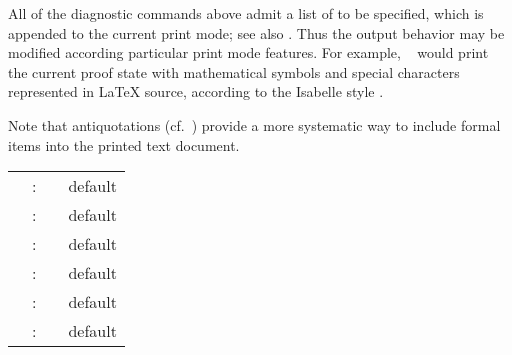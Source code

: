 \begin{isabellebody}
\begin{isamarkuptext}
\begin{description}
  \end{description}

  All of the diagnostic commands above admit a list of 
  to be specified, which is appended to the current print mode; see
  also .  Thus the output behavior may be
  modified according particular print mode features.  For example,
  \hyperlink{command.pr}{\mbox{}}~ would print the current
  proof state with mathematical symbols and special characters
  represented in {\LaTeX} source, according to the Isabelle style
  \cite{isabelle-sys}.

  Note that antiquotations (cf.\ ) provide a more
  systematic way to include formal items into the printed text
  document.%
\end{isamarkuptext}%
\isamarkuptrue%
%
\isamarkuptrue%
%
\begin{isamarkuptext}%
\begin{tabular}{rcll}
    \indexdef{}{attribute}{show\_types}\hypertarget{attribute.show-types}{\hyperlink{attribute.show-types}{\mbox{\isa{show{\isaliteral{5F}{\isacharunderscore}}types}}}} & : & \isa{attribute} & default \isa{false} \\
    \indexdef{}{attribute}{show\_sorts}\hypertarget{attribute.show-sorts}{\hyperlink{attribute.show-sorts}{\mbox{\isa{show{\isaliteral{5F}{\isacharunderscore}}sorts}}}} & : & \isa{attribute} & default \isa{false} \\
    \indexdef{}{attribute}{show\_consts}\hypertarget{attribute.show-consts}{\hyperlink{attribute.show-consts}{\mbox{\isa{show{\isaliteral{5F}{\isacharunderscore}}consts}}}} & : & \isa{attribute} & default \isa{false} \\
    \indexdef{}{attribute}{show\_abbrevs}\hypertarget{attribute.show-abbrevs}{\hyperlink{attribute.show-abbrevs}{\mbox{\isa{show{\isaliteral{5F}{\isacharunderscore}}abbrevs}}}} & : & \isa{attribute} & default \isa{true} \\
    \indexdef{}{attribute}{show\_brackets}\hypertarget{attribute.show-brackets}{\hyperlink{attribute.show-brackets}{\mbox{\isa{show{\isaliteral{5F}{\isacharunderscore}}brackets}}}} & : & \isa{attribute} & default \isa{false} \\
    \indexdef{}{attribute}{names\_long}\hypertarget{attribute.names-long}{\hyperlink{attribute.names-long}{\mbox{\isa{names{\isaliteral{5F}{\isacharunderscore}}long}}}} & : & \isa{attribute} & default \isa{false} \\

\end{tabular}
\end{isamarkuptext}
\end{isabellebody}
